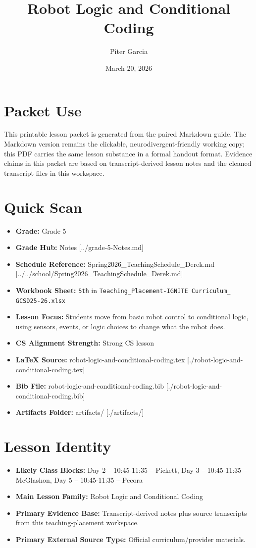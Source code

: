 \documentclass[11pt]{article}
\title{Robot Logic and Conditional Coding}
\author{Piter Garcia}
\date{March 20, 2026}
\begin{document}
\maketitle
\section*{Packet Use}
This printable lesson packet is generated from the paired Markdown guide. The Markdown version remains the clickable, neurodivergent-friendly working copy; this PDF carries the same lesson substance in a formal handout format. Evidence claims in this packet are based on transcript-derived lesson notes and the cleaned transcript files in this workspace.

\section*{Quick Scan}
\begin{itemize}[leftmargin=*]
\item \textbf{Grade:} Grade 5
\item \textbf{Grade Hub:} Notes [../grade-5-Notes.md]
\item \textbf{Schedule Reference:} Spring2026\_TeachingSchedule\_Derek.md [../../school/Spring2026\_TeachingSchedule\_Derek.md]
\item \textbf{Workbook Sheet:} \texttt{5th} in \texttt{Teaching\_Placement-IGNITE Curriculum\_ GCSD25-26.xlsx}
\item \textbf{Lesson Focus:} Students move from basic robot control to conditional logic, using sensors, events, or logic choices to change what the robot does.
\item \textbf{CS Alignment Strength:} Strong CS lesson
\item \textbf{LaTeX Source:} robot-logic-and-conditional-coding.tex [./robot-logic-and-conditional-coding.tex]
\item \textbf{Bib File:} robot-logic-and-conditional-coding.bib [./robot-logic-and-conditional-coding.bib]
\item \textbf{Artifacts Folder:} artifacts/ [./artifacts/]
\end{itemize}

\section*{Lesson Identity}
\begin{itemize}[leftmargin=*]
\item \textbf{Likely Class Blocks:} Day 2 -- 10:45-11:35 -- Pickett, Day 3 -- 10:45-11:35 -- McGlashon, Day 5 -- 10:45-11:35 -- Pecora
\item \textbf{Main Lesson Family:} Robot Logic and Conditional Coding
\item \textbf{Primary Evidence Base:} Transcript-derived notes plus source transcripts from this teaching-placement workspace.
\item \textbf{Primary External Source Type:} Official curriculum/provider materials.
\end{itemize}
\end{document}
